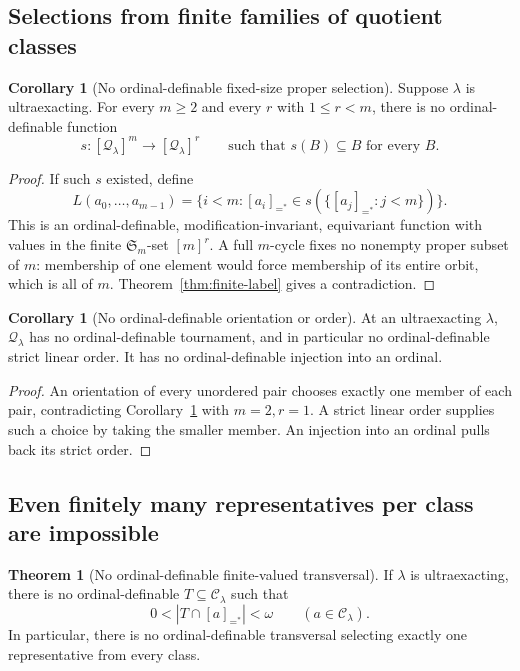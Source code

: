 \documentclass[11pt,letterpaper]{article}
\theoremstyle{definition}
\newtheorem{theorem}[definition]{Theorem}
\newtheorem{corollary}[definition]{Corollary}
\newcommand{\Sym}{\mathfrak S}
\newcommand{\CC}{\mathcal C}
\newcommand{\QQ}{\mathcal Q}
\begin{document}
\subsection{Selections from finite families of quotient classes}

\begin{corollary}[No ordinal-definable fixed-size proper selection]\label{cor:finite-selection}
Suppose $\lambda$ is ultraexacting. For every $m\geq2$ and every $r$ with $1\leq r<m$, there is no ordinal-definable function
\[
 s:[\QQ_\lambda]^m\longrightarrow[\QQ_\lambda]^r
 \qquad\text{such that }s(B)\subseteq B\text{ for every }B.
\]
\end{corollary}

\begin{proof}
If such $s$ existed, define
\[
 L(a_0,\ldots,a_{m-1})
    =\{i<m:[a_i]_{=^*}\in s(\{[a_j]_{=^*}:j<m\})\}.
\]
This is an ordinal-definable, modification-invariant, equivariant function with values in the finite $\Sym_m$-set $[m]^r$. A full $m$-cycle fixes no nonempty proper subset of $m$: membership of one element would force membership of its entire orbit, which is all of $m$. Theorem~\ref{thm:finite-label} gives a contradiction.
\end{proof}

\begin{corollary}[No ordinal-definable orientation or order]\label{cor:no-order}
At an ultraexacting $\lambda$, $\QQ_\lambda$ has no ordinal-definable tournament, and in particular no ordinal-definable strict linear order. It has no ordinal-definable injection into an ordinal.
\end{corollary}

\begin{proof}
An orientation of every unordered pair chooses exactly one member of each pair, contradicting Corollary~\ref{cor:finite-selection} with $m=2,r=1$. A strict linear order supplies such a choice by taking the smaller member. An injection into an ordinal pulls back its strict order.
\end{proof}

\subsection{Even finitely many representatives per class are impossible}

\begin{theorem}[No ordinal-definable finite-valued transversal]\label{thm:transversal}
If $\lambda$ is ultraexacting, there is no ordinal-definable $T\subseteq\CC_\lambda$ such that
\begin{equation}\label{eq:finite-transversal}
 0<|T\cap[a]_{=^*}|<\omega
 \qquad(a\in\CC_\lambda).
\end{equation}
In particular, there is no ordinal-definable transversal selecting exactly one representative from every class.
\end{theorem}
\end{document}
